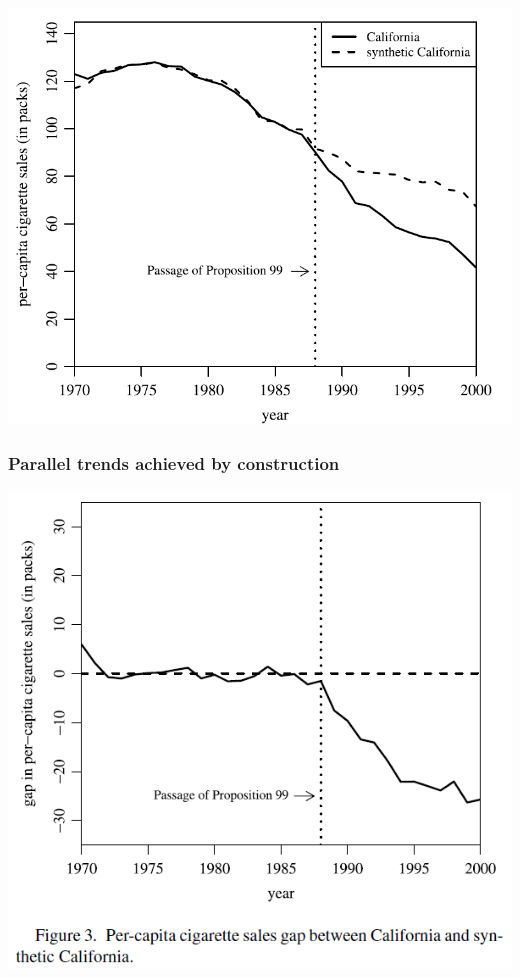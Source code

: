 \begin{frame}
  \frametitle{}
  \begin{center}
    \includegraphics[height=.9\textheight]{./resources/ADHCAsynth}
  \end{center}  
\end{frame}

\begin{frame}
  \frametitle{Parallel trends achieved by construction}
  \vspace{-10pt}
  \begin{center}
    \includegraphics[height=.9\textheight]{./resources/ADHSdifftrends}
  \end{center}  
\end{frame}

